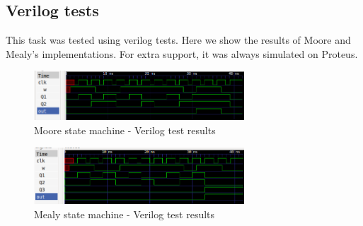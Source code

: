 \subsection*{Verilog tests}
This task was tested using verilog tests. Here we show the results of Moore and Mealy's implementations.
For extra support, it was always simulated on Proteus.

\begin{figure}[H]
    \begin{centering}
    \includegraphics[width=0.7\textwidth]{data/Graficos2/2b.png}
    \par\end{centering}
    \caption{Moore state machine - Verilog test results}
\end{figure}

\begin{figure}[H]
    \begin{centering}
    \includegraphics[width=0.7\textwidth]{data/Graficos2/2a.png}
    \par\end{centering}
    \caption{Mealy state machine - Verilog test results}
\end{figure}

